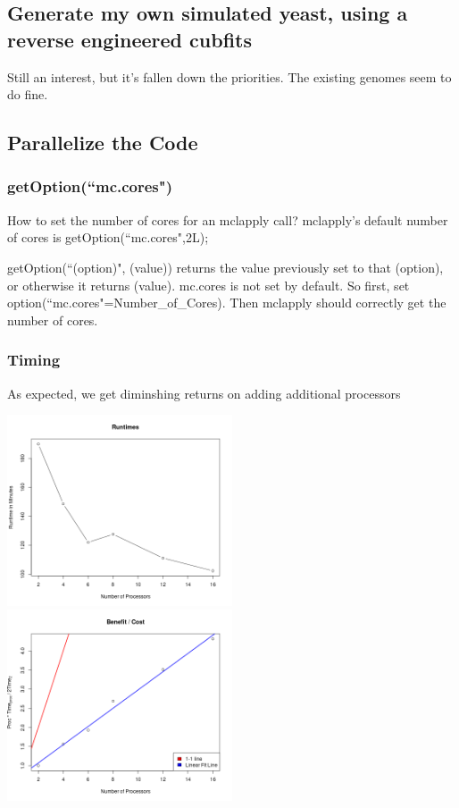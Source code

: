 \subsection{Generate my own simulated yeast, using a reverse engineered cubfits}

Still an interest, but it's fallen down the priorities. The existing genomes seem to do fine.


\subsection{Parallelize the Code}

\subsubsection{getOption(``mc.cores")}
How to set the number of cores for an mclapply call? mclapply's default number of cores is getOption(``mc.cores",2L);

getOption(``(option)", (value)) returns the value previously set to that (option), or otherwise it returns (value). mc.cores is not set by default. So first, set option(``mc.cores"=Number\_of\_Cores). Then mclapply should correctly get the number of cores.

\subsubsection{Timing}

As expected, we get diminshing returns on adding additional processors

\includegraphics[width=0.5\textwidth]{data/1105runtimes.png}
\includegraphics[width=0.5\textwidth]{data/1105timingCostBenefit.png}


